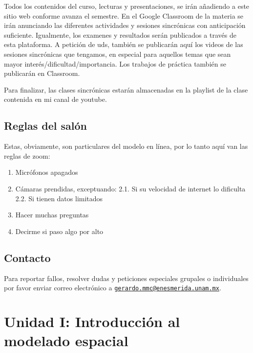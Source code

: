 \documentclass[
]{book}
\providecommand{\tightlist}{%
  \setlength{\itemsep}{0pt}\setlength{\parskip}{0pt}}
\begin{document}
Todos los contenidos del curso, lecturas y presentaciones, se irán añadiendo a este sitio web conforme avanza el semestre. En el Google Classroom de la materia se irán anunciando las diferentes actividades y sesiones sincrónicas con anticipación suficiente. Igualmente, los examenes y resultados serán publicados a través de esta plataforma. A petición de uds, también se publicarán aquí los videos de las sesiones sincrónicas que tengamos, en especial para aquellos temas que sean mayor interés/dificultad/importancia. Los trabajos de práctica también se publicarán en Classroom.

Para finalizar, las clases sincrónicas estarán almacenadas en la playlist de la clase contenida en mi canal de youtube.

\hypertarget{reglas-del-saluxf3n}{%
\section{Reglas del salón}\label{reglas-del-saluxf3n}}

Estas, obviamente, son particulares del modelo en línea, por lo tanto aquí van las reglas de zoom:

\begin{enumerate}
\def\labelenumi{\arabic{enumi}.}
\tightlist
\item
  Micrófonos apagados
\item
  Cámaras prendidas, exceptuando:
  2.1. Si su velocidad de internet lo dificulta
  2.2. Si tienen datos limitados
\item
  Hacer muchas preguntas
\item
  Decirme si paso algo por alto
\end{enumerate}

\hypertarget{contacto}{%
\section{Contacto}\label{contacto}}

Para reportar fallos, resolver dudas y peticiones especiales grupales o individuales por favor enviar correo electrónico a \href{mailto:gerardo.mmc@enesmerida.unam.mx}{\nolinkurl{gerardo.mmc@enesmerida.unam.mx}}.

\hypertarget{unidad-i-introducciuxf3n-al-modelado-espacial}{%
\chapter{Unidad I: Introducción al modelado espacial}\label{unidad-i-introducciuxf3n-al-modelado-espacial}}
\end{document}
